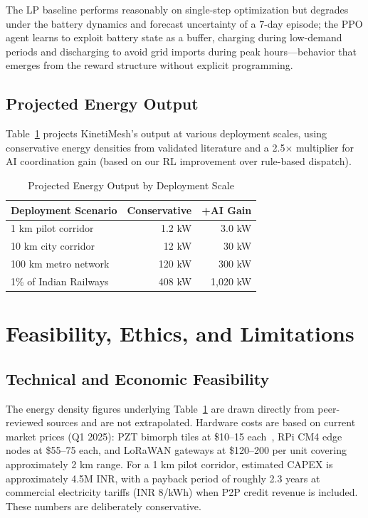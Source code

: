 \documentclass[conference]{IEEEtran}
\begin{document}
The LP baseline performs reasonably on single-step optimization but degrades under the battery dynamics and forecast uncertainty of a 7-day episode; the PPO agent learns to exploit battery state as a buffer, charging during low-demand periods and discharging to avoid grid imports during peak hours—behavior that emerges from the reward structure without explicit programming.

\subsection{Projected Energy Output}

Table~\ref{tab:scale} projects KinetiMesh's output at various deployment scales, using conservative energy densities from validated literature and a 2.5$\times$ multiplier for AI coordination gain (based on our RL improvement over rule-based dispatch).

\begin{table}[ht]
\caption{Projected Energy Output by Deployment Scale}
\label{tab:scale}
\centering
\begin{tabular}{lrr}
\toprule
\textbf{Deployment Scenario} & \textbf{Conservative} & \textbf{+AI Gain} \\
\midrule
1 km pilot corridor   & 1.2 kW  & 3.0 kW  \\
10 km city corridor   & 12 kW   & 30 kW   \\
100 km metro network  & 120 kW  & 300 kW  \\
1\% of Indian Railways & 408 kW & 1,020 kW \\
\bottomrule
\end{tabular}
\end{table}

\section{Feasibility, Ethics, and Limitations}

\subsection{Technical and Economic Feasibility}

The energy density figures underlying Table~\ref{tab:scale} are drawn directly from peer-reviewed sources and are not extrapolated. Hardware costs are based on current market prices (Q1 2025): PZT bimorph tiles at \$10--15 each~\cite{selim2024}, RPi CM4 edge nodes at \$55--75 each, and LoRaWAN gateways at \$120--200 per unit covering approximately 2 km range. For a 1 km pilot corridor, estimated CAPEX is approximately 4.5M INR, with a payback period of roughly 2.3 years at commercial electricity tariffs (INR 8/kWh) when P2P credit revenue is included. These numbers are deliberately conservative.
\end{document}
